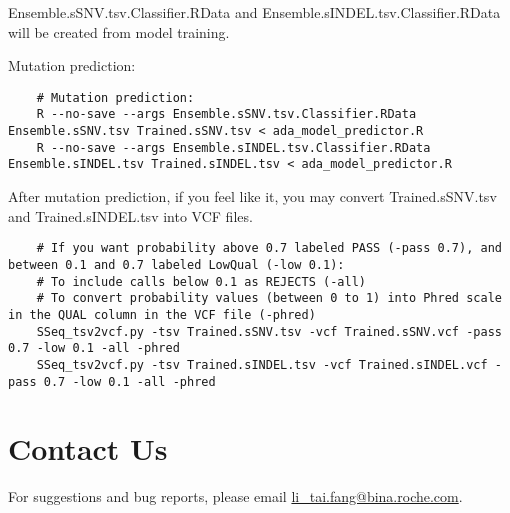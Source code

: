 \documentclass[10pt,letterpaper]{article}
\begin{document}
	Ensemble.sSNV.tsv.Classifier.RData and Ensemble.sINDEL.tsv.Classifier.RData will be created from model training.
	

	Mutation prediction:
	
	\begin{lstlisting}
	# Mutation prediction:
	R --no-save --args Ensemble.sSNV.tsv.Classifier.RData Ensemble.sSNV.tsv Trained.sSNV.tsv < ada_model_predictor.R
	R --no-save --args Ensemble.sINDEL.tsv.Classifier.RData Ensemble.sINDEL.tsv Trained.sINDEL.tsv < ada_model_predictor.R
	\end{lstlisting}

	
	After mutation prediction, if you feel like it, you may convert Trained.sSNV.tsv and Trained.sINDEL.tsv into VCF files. 

	\begin{lstlisting}
	# If you want probability above 0.7 labeled PASS (-pass 0.7), and between 0.1 and 0.7 labeled LowQual (-low 0.1):
	# To include calls below 0.1 as REJECTS (-all)
	# To convert probability values (between 0 to 1) into Phred scale in the QUAL column in the VCF file (-phred)
	SSeq_tsv2vcf.py -tsv Trained.sSNV.tsv -vcf Trained.sSNV.vcf -pass 0.7 -low 0.1 -all -phred
	SSeq_tsv2vcf.py -tsv Trained.sINDEL.tsv -vcf Trained.sINDEL.vcf -pass 0.7 -low 0.1 -all -phred
	\end{lstlisting}





\section{Contact Us}
For suggestions and bug reports, please email \href{mailto:li_tai.fang@bina.roche.com}{ li\_tai.fang@bina.roche.com}.
\end{document}
